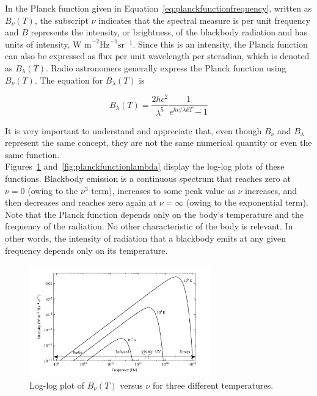In the Planck function given in Equation~\eqref{eq:planckfunctionfrequency}, written as $B_\nu(T)$, the subscript $\nu$ indicates that the spectral measure is per unit frequency and $B$ represents the intensity, or brightness, of the blackbody radiation and has units of intensity, \( \text{W m}^{-2} \text{Hz}^{-1} \text{sr}^{-1} \). Since this is an intensity, the Planck function can also be expressed as flux per unit wavelength per steradian, which is denoted as $B_\lambda(T)$. Radio astronomers generally express the Planck function using $B_\nu(T)$. The equation for $B_\lambda(T)$ is

\begin{equation}
	B_\lambda (T) = \frac{2hc^2}{\lambda^5} \frac{1}{e^{hc / \lambda k T} - 1}
	\label{eq:planckfunctionwavelength}
\end{equation}


It is very important to understand and appreciate that, even though \(B_\nu\) and \(B_\lambda\) represent the same concept, they are not the same numerical quantity or even the same function. \\

Figures~\ref{fig:planckfunctionnu} and~\ref{fig:planckfunctionlambda} display the log-log plots of these functions. Blackbody emission is a continuous spectrum that reaches zero at \(\nu = 0\) (owing to the \(\nu^3\) term), increases to some peak value as \(\nu\) increases, and then decreases and reaches zero again at \(\nu = \infty\) (owing to the exponential term). Note that the Planck function depends only on the body’s temperature and the frequency of the radiation. No other characteristic of the body is relevant. In other words, the intensity of radiation that a blackbody emits at any given frequency depends only on its temperature. \\

\begin{figure}[H]
	\centering
	\includegraphics[width=0.7\textwidth]{Images/B_nu_plot.png}
	\caption{Log-log plot of $B_{\nu}(T)$ versus $\nu$ for three different temperatures.}
	\label{fig:planckfunctionnu}
\end{figure}

